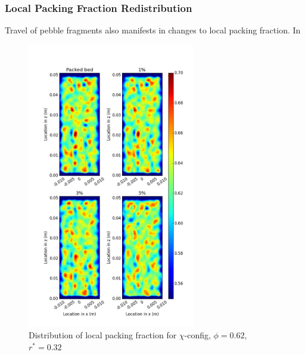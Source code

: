 \subsubsection{Local Packing Fraction Redistribution}
Travel of pebble fragments also manifests in changes to local packing fraction. In 
\begin{figure}[!t]
    \centering
    \includegraphics[width = 0.65\textwidth]{figures/x-62-r23-1.png}
    \caption{Distribution of local packing fraction for $\chi$-config, $\phi = 0.62$, $r^* = 0.32$}\label{fig:x-62-r23}
\end{figure}

